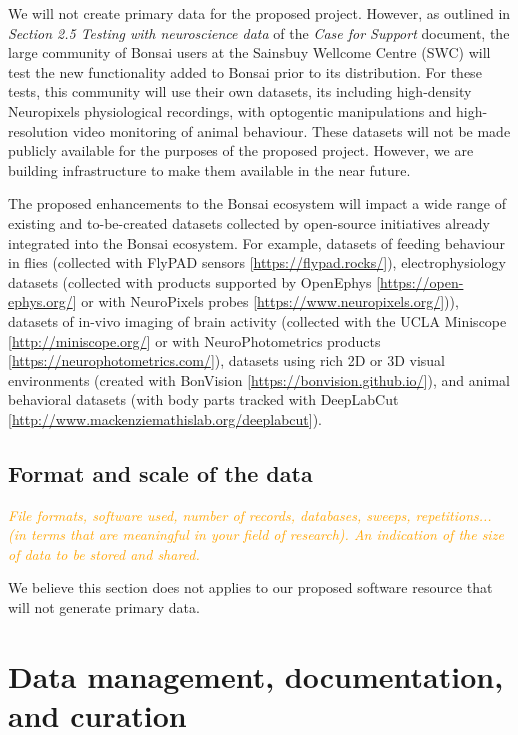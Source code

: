 \documentclass[a4paper,11pt]{article}
\renewcommand{\footnote}[1]{ [#1]}
\begin{document}
We will not create primary data for the proposed project. However, as outlined
in \emph{Section 2.5 Testing with neuroscience data} of the \emph{Case for
Support} document, the large community of Bonsai users at the Sainsbuy Wellcome
Centre (SWC) will test the new functionality added to Bonsai prior to its
distribution. For these tests, this community will use their own datasets, its
including high-density Neuropixels physiological recordings, with optogentic
manipulations and high-resolution video monitoring of animal behaviour. These
datasets will not be made publicly available for the purposes of the proposed
project. However, we are building infrastructure to make them available in the
near future.

The proposed enhancements to the Bonsai ecosystem will impact a wide range of
existing and to-be-created datasets collected by open-source initiatives
already integrated into the Bonsai ecosystem. For example, datasets of feeding
behaviour in flies (collected with FlyPAD
sensors\footnote{\url{https://flypad.rocks/}}), electrophysiology datasets
(collected with products supported by
OpenEphys\footnote{\url{https://open-ephys.org/}} or with NeuroPixels
probes\footnote{\url{https://www.neuropixels.org/}})), datasets of in-vivo
imaging of brain activity (collected with the UCLA
Miniscope\footnote{\url{http://miniscope.org/}} or with NeuroPhotometrics
products\footnote{\url{https://neurophotometrics.com/}}), datasets using rich
2D or 3D visual environments (created with
BonVision\footnote{\url{https://bonvision.github.io/}}), and animal behavioral
datasets (with body parts tracked with
DeepLabCut\footnote{\url{http://www.mackenziemathislab.org/deeplabcut}}).

\subsection{Format and scale of the data}

\textcolor{orange}{\textit{File formats, software used, number of records, databases, sweeps, repetitions... (in terms that are meaningful in your field of research). An indication of the size of data to be stored and shared.}}

We believe this section does not applies to our proposed software resource that
will not generate primary data.

\section{Data management, documentation, and curation}
\end{document}
